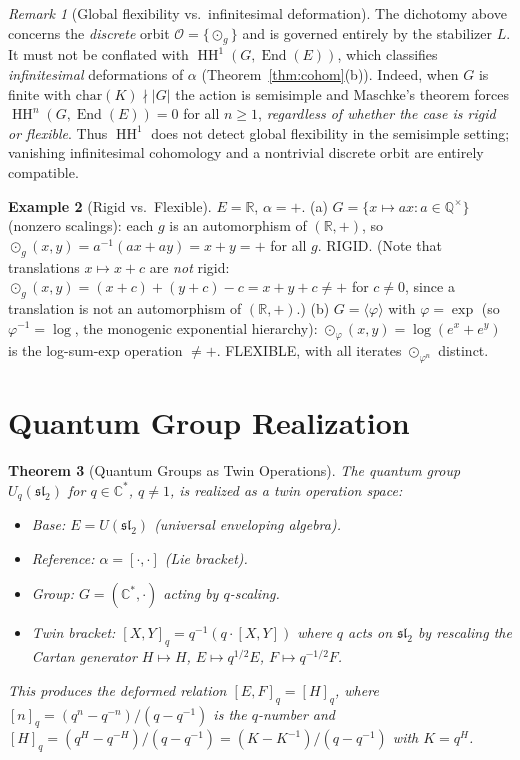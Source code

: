 \documentclass[11pt,twocolumn]{article}
\theoremstyle{plain}\newtheorem{theorem}{Theorem}\newtheorem{proposition}[theorem]{Proposition}\newtheorem{corollary}[theorem]{Corollary}\newtheorem{lemma}[theorem]{Lemma}
\theoremstyle{definition}\newtheorem{definition}[theorem]{Definition}\newtheorem{example}[theorem]{Example}
\theoremstyle{remark}\newtheorem{remark}[theorem]{Remark}
\newcommand{\HH}{\operatorname{HH}}
\newcommand{\End}{\operatorname{End}}
\begin{document}
\begin{remark}[Global flexibility vs.\ infinitesimal deformation]
The dichotomy above concerns the \emph{discrete} orbit $\mathcal{O} = \{\odot_g\}$ and is governed entirely by the stabilizer $L$. It must not be conflated with $\HH^1(G,\End(E))$, which classifies \emph{infinitesimal} deformations of $\alpha$ (Theorem~\ref{thm:cohom}(b)). Indeed, when $G$ is finite with $\mathrm{char}(K)\nmid |G|$ the action is semisimple and Maschke's theorem forces $\HH^n(G,\End(E)) = 0$ for all $n \geq 1$, \emph{regardless of whether the case is rigid or flexible}. Thus $\HH^1$ does not detect global flexibility in the semisimple setting; vanishing infinitesimal cohomology and a nontrivial discrete orbit are entirely compatible.
\end{remark}

\begin{example}[Rigid vs.\ Flexible]
$E = \mathbb{R}$, $\alpha = +$. (a) $G = \{x \mapsto a x : a \in \mathbb{Q}^\times\}$ (nonzero scalings): each $g$ is an automorphism of $(\mathbb{R},+)$, so $\odot_g(x,y) = a^{-1}(ax + ay) = x + y = +$ for all $g$. RIGID. (Note that translations $x\mapsto x+c$ are \emph{not} rigid: $\odot_g(x,y) = (x+c)+(y+c)-c = x+y+c \neq +$ for $c\neq 0$, since a translation is not an automorphism of $(\mathbb{R},+)$.) (b) $G = \langle \varphi \rangle$ with $\varphi = \exp$ (so $\varphi^{-1} = \log$, the monogenic exponential hierarchy): $\odot_\varphi(x,y) = \log(e^x + e^y)$ is the log-sum-exp operation $\neq +$. FLEXIBLE, with all iterates $\odot_{\varphi^n}$ distinct.
\end{example}


\section{Quantum Group Realization}
\label{sec:quantum}

\begin{theorem}[Quantum Groups as Twin Operations]\label{thm:quantum}
The quantum group $U_q(\mathfrak{sl}_2)$ for $q \in \mathbb{C}^*$, $q \neq 1$, is realized as a twin operation space:
\begin{itemize}
    \item Base: $E = U(\mathfrak{sl}_2)$ (universal enveloping algebra).
    \item Reference: $\alpha = [\cdot, \cdot]$ (Lie bracket).
    \item Group: $G = (\mathbb{C}^*, \cdot)$ acting by $q$-scaling.
    \item Twin bracket: $[X, Y]_q = q^{-1}(q \cdot [X, Y])$ where $q$ acts on $\mathfrak{sl}_2$ by rescaling the Cartan generator $H \mapsto H$, $E \mapsto q^{1/2}E$, $F \mapsto q^{-1/2}F$.
\end{itemize}
This produces the deformed relation $[E, F]_q = [H]_q$, where $[n]_q = (q^n - q^{-n})/(q - q^{-1})$ is the $q$-number and $[H]_q = (q^H - q^{-H})/(q-q^{-1}) = (K - K^{-1})/(q - q^{-1})$ with $K = q^H$.
\end{theorem}
\end{document}
